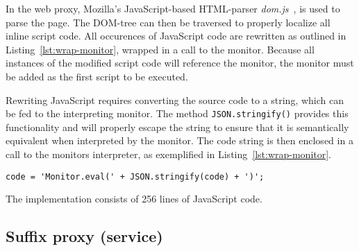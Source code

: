 \documentclass{llncs}
\begin{document}
In the web proxy, Mozilla's JavaScript-based HTML-parser \emph{dom.js}~\cite{Mozilla:dom.js}, is used 
to parse the page. The DOM-tree can then be traversed to properly localize 
all inline script code. All occurences of JavaScript code are rewritten as 
outlined in Listing~\ref{lst:wrap-monitor}, wrapped in a call to the monitor.
Because all instances of the modified script code will reference the monitor, 
the monitor must be added as the first script to be executed.


Rewriting JavaScript requires converting the source code to a string, which can 
be fed to the interpreting monitor. The method \lstinline{JSON.stringify()} 
provides this functionality and will properly escape the string to ensure that 
it is semantically equivalent when interpreted by the monitor. The code string is then enclosed in a call to the monitors 
interpreter, as exemplified in Listing~\ref{lst:wrap-monitor}.
\begin{lstlisting}[language=langsmall,label=lst:wrap-monitor, caption=Example of monitor wrapping]
code = 'Monitor.eval(' + JSON.stringify(code) + ')';
\end{lstlisting}
The implementation consists of 256 lines of JavaScript code.


\vspace{-.4cm}
\subsection{Suffix proxy (service)}
\vspace{-.2cm}



%
\end{document}
